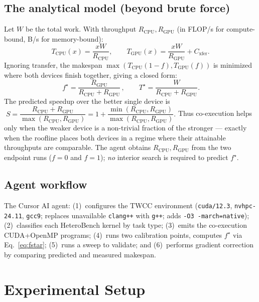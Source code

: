 \documentclass[conference]{IEEEtran}
\begin{document}
\subsection{The analytical model (beyond brute force)}
Let $W$ be the total work. With throughput $R_\mathrm{CPU},R_\mathrm{GPU}$ (in FLOP/s for
compute-bound, B/s for memory-bound):
\begin{equation}
T_\mathrm{CPU}(x)=\frac{xW}{R_\mathrm{CPU}},\qquad
T_\mathrm{GPU}(x)=\frac{xW}{R_\mathrm{GPU}}+C_\mathrm{xfer}.
\end{equation}
Ignoring transfer, the makespan $\max(T_\mathrm{CPU}(1{-}f),T_\mathrm{GPU}(f))$ is minimized
where both devices finish together, giving a closed form:
\begin{equation}
\boxed{\,f^\star=\frac{R_\mathrm{GPU}}{R_\mathrm{CPU}+R_\mathrm{GPU}}\,},\qquad
T^\star=\frac{W}{R_\mathrm{CPU}+R_\mathrm{GPU}}.
\label{eq:fstar}
\end{equation}
The predicted speedup over the better single device is
$\;S=\dfrac{R_\mathrm{CPU}+R_\mathrm{GPU}}{\max(R_\mathrm{CPU},R_\mathrm{GPU})}=1+\dfrac{\min(R_\mathrm{CPU},R_\mathrm{GPU})}{\max(R_\mathrm{CPU},R_\mathrm{GPU})}.$
Thus co-execution helps only when the weaker device is a non-trivial fraction of the
stronger --- exactly when the roofline places both devices in a regime where their
attainable throughputs are comparable. The agent obtains $R_\mathrm{CPU},R_\mathrm{GPU}$
from the two endpoint runs ($f{=}0$ and $f{=}1$); \emph{no} interior search is required to
predict $f^\star$.

\subsection{Agent workflow}
The Cursor AI agent: (1)~configures the TWCC environment (\texttt{cuda/12.3},
\texttt{nvhpc-24.11}, \texttt{gcc9}; replaces unavailable \texttt{clang++} with
\texttt{g++}; adds \texttt{-O3 -march=native}); (2)~classifies each HeteroBench kernel by
task type; (3)~emits the co-execution CUDA+OpenMP programs; (4)~runs two calibration
points, computes $f^\star$ via Eq.~\ref{eq:fstar}; (5)~runs a sweep to validate; and
(6)~performs gradient correction by comparing predicted and measured makespan.

\section{Experimental Setup}
\end{document}
